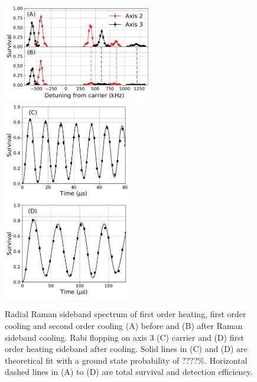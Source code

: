 \documentclass[aps,prl,twocolumn,groupedaddress]{revtex4-1}
\begin{document}
\begin{figure}
  \includegraphics[height=4.3cm]{imgs/spectrum_r.pdf}
  \includegraphics[height=4.3cm]{imgs/rabi_flop_r3_0.pdf}
  \includegraphics[height=4.3cm]{imgs/rabi_flop_r3_p1.pdf}
  \caption{Radial Raman sideband spectrum of first order heating, first order cooling and
    second order cooling (A) before and (B) after Raman sideband cooling.
    Rabi flopping on axis 3 (C) carrier and (D) first order heating sideband
    after cooling.
    Solid lines in (C) and (D) are theoretical fit with a ground state probability of $????\%$.
    Horizontal dashed lines in (A) to (D) are total survival and detection efficiency.
    \label{f-radial}}
\end{figure}
\end{document}
